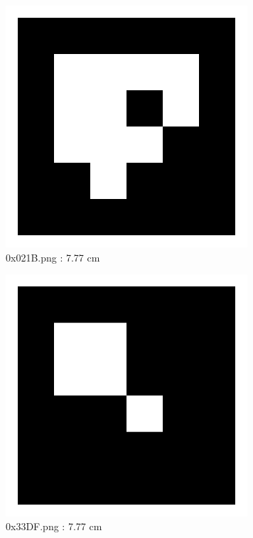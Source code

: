 \documentclass[11pt,a4,BCOR=0cm]{scrartcl}
\begin{document}
\begin{figure}
  \centering
    \includegraphics[natwidth=400,natheight=400,width=9cm]{0x021B.png}
    \caption{0x021B.png : 7.77 cm}
    \label{fig:0x021B.png}
  
\end{figure} 

\clearpage

\begin{figure}
  \centering
    \includegraphics[natwidth=400,natheight=400,width=9cm]{0x33DF.png}
    \caption{0x33DF.png : 7.77 cm}
    \label{fig:0x33DF.png}
  
\end{figure} 
\end{document}
